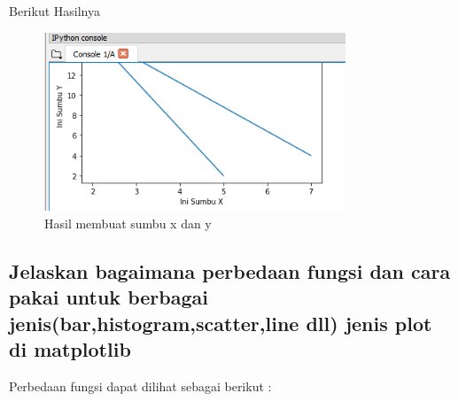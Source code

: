 Berikut Hasilnya
\begin{figure}[H]
	\includegraphics[width=9cm]{figures/6/Teori/1174096/1.png}
	\caption{Hasil membuat sumbu x dan y}
	\centering
\end{figure}

\subsection{Jelaskan bagaimana perbedaan fungsi dan cara pakai untuk berbagai jenis(bar,histogram,scatter,line dll) jenis plot di matplotlib}
Perbedaan fungsi dapat dilihat sebagai berikut :
